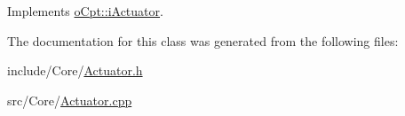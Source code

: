Implements \hyperlink{classo_cpt_1_1i_actuator_ae3f9fbb61d920bee1bd297fb5a89625e}{o\+Cpt\+::i\+Actuator}.



The documentation for this class was generated from the following files\+:\begin{DoxyCompactItemize}
\item 
include/\+Core/\hyperlink{_actuator_8h}{Actuator.\+h}\item 
src/\+Core/\hyperlink{_actuator_8cpp}{Actuator.\+cpp}\end{DoxyCompactItemize}

